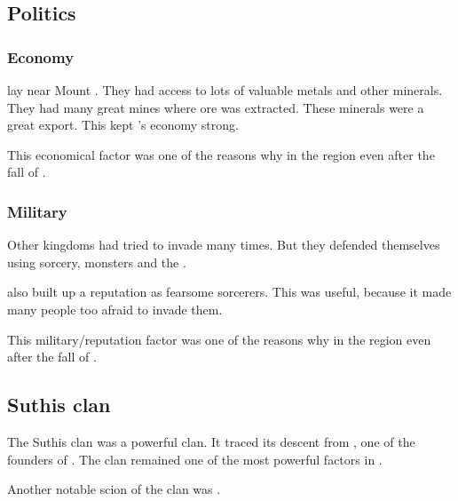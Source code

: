 \subsection{Politics}





\subsubsection{Economy}
\Yormis lay near Mount .
They had access to lots of valuable metals and other minerals. 
They had many great mines where ore was extracted. 
These minerals were a great export.
This kept \Yormis's economy strong. 

This economical factor was one of the reasons why  in the region even after the fall of \Ortaica. 





\subsubsection{Military}
Other kingdoms had tried to invade \Yormis many times. 
But they defended themselves using sorcery, monsters and the \wylde. 

\Yormis also built up a reputation as fearsome sorcerers.
This was useful, because it made many people too afraid to invade them. 

This military/reputation factor was one of the reasons why  in the region even after the fall of \Ortaica. 









\subsection{Suthis clan}
The Suthis clan was a powerful \scathaese clan. 
It traced its descent from , one of the founders of \Yormis.
The clan remained one of the most powerful factors in \Yormis.

Another notable scion of the clan was .





